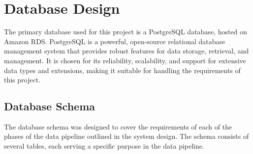 \section{Database Design}\label{sec:database_design}

The primary database used for this project is a PostgreSQL database, hosted on Amazon RDS.
PostgreSQL is a powerful, open-source relational database management system that provides robust features for data storage, retrieval, and management.
It is chosen for its reliability, scalability, and support for extensive data types and extensions, making it suitable for handling the requirements of this project.

\subsection{Database Schema}\label{subsec:database_schema}

The database schema was designed to cover the requirements of each of the phases of the data pipeline outlined in the system design.
The schema consists of several tables, each serving a specific purpose in the data pipeline.

